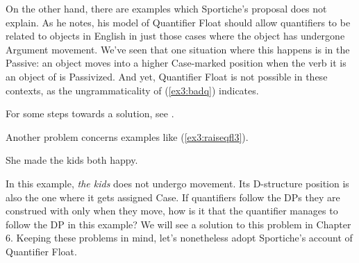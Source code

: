 On the other hand, there are examples which Sportiche's proposal does not explain. As he notes, his model of Quantifier Float should allow quantifiers to be related to objects in English in just those cases where the object has undergone Argument movement. We've seen that one situation where this happens is in the Passive: an object moves into a higher Case-marked position when the verb it is an object of is Passivized. And yet, Quantifier Float is not possible in these contexts, as the ungrammaticality of (\ref{ex3:badq}) indicates.
\begin{exe}
\end{exe}
For some steps towards a solution, see \citet{Boskovic:2001,Boskovic:2004a}. 

Another problem concerns examples like (\ref{ex3:raiseqfl3}).
\begin{exe}
 She made the kids both happy.
\end{exe}
In this example, \emph{the kids} does not undergo movement. Its D-structure position is also the one where it gets assigned Case. If quantifiers follow the DPs they are construed with only when they move, how is it that the quantifier manages to follow the DP in this example? We will see a solution to this problem in Chapter 6. Keeping these problems in mind, let's nonetheless adopt Sportiche's account of Quantifier Float.

